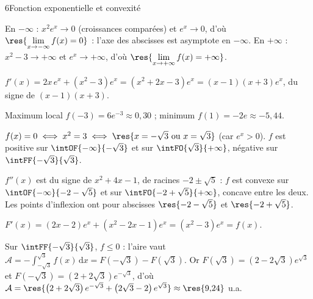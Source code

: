 \begin{corrigeBac}{6}{Fonction exponentielle et convexité}
\begin{questions}
  \item En $-\infty$ : $x^{2}e^{x}\to0$ (croissances comparées) et $e^{x}\to0$, d'où $\res{\lim\limits_{x\to-\infty}f(x)=0}$ : l'axe des
    abscisses est asymptote en $-\infty$. En $+\infty$ : $x^{2}-3\to+\infty$ et $e^{x}\to+\infty$, d'où $\res{\lim\limits_{x\to+\infty}f(x)=+\infty}$. \pts{1 pt}
  \item $f'(x)=2x\,e^{x}+\left(x^{2}-3\right)e^{x}=\left(x^{2}+2x-3\right)e^{x}=(x-1)(x+3)e^{x}$, du signe de $(x-1)(x+3)$.
\begin{center}
\begin{tableau}
\end{tableau}
\end{center}
    Maximum local $f(-3)=6e^{-3}\approx0{,}30$ ; minimum $f(1)=-2e\approx-5{,}44$. 
  \item $f(x)=0\iff x^{2}=3\iff\res{x=-\sqrt3\text{ ou }x=\sqrt3}$ (car $e^{x}>0$). $f$ est positive sur $\intOF{-\infty}{-\sqrt3}$ et sur
    $\intFO{\sqrt3}{+\infty}$, négative sur $\intFF{-\sqrt3}{\sqrt3}$. 
\end{questions}
\begin{questions}[resume]
  \item $f''(x)$ est du signe de $x^{2}+4x-1$, de racines $-2\pm\sqrt5$ : $f$ est convexe sur $\intOF{-\infty}{-2-\sqrt5}$ et sur
    $\intFO{-2+\sqrt5}{+\infty}$, concave entre les deux. Les points d'inflexion ont pour abscisses $\res{-2-\sqrt5}$ et $\res{-2+\sqrt5}$. \pts{1 pt}
  \item $F'(x)=(2x-2)e^{x}+\left(x^{2}-2x-1\right)e^{x}=\left(x^{2}-3\right)e^{x}=f(x)$. 
  \item Sur $\intFF{-\sqrt3}{\sqrt3}$, $f\leq0$ : l'aire vaut $\mathcal{A}=-\int_{-\sqrt3}^{\sqrt3}f(x)\,\mathrm{d}x=F\left(-\sqrt3\right)-F\left(\sqrt3\right)$.
    Or $F\left(\sqrt3\right)=\left(2-2\sqrt3\right)e^{\sqrt3}$ et $F\left(-\sqrt3\right)=\left(2+2\sqrt3\right)e^{-\sqrt3}$, d'où
    $\mathcal{A}=\res{\left(2+2\sqrt3\right)e^{-\sqrt3}+\left(2\sqrt3-2\right)e^{\sqrt3}}\approx\res{9{,}24}$ u.a. 
\end{questions}
\end{corrigeBac}

